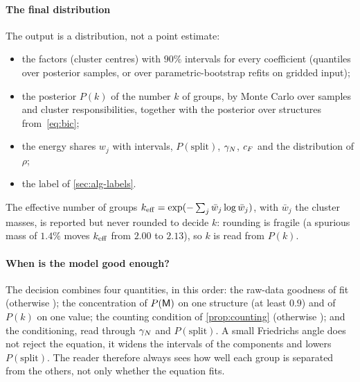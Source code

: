 \paragraph{The final distribution}
The output is a distribution, not a point estimate:
\begin{itemize}
  \item the factors (cluster centres) with $90\%$ intervals for every coefficient (quantiles over posterior samples, or over
  parametric-bootstrap refits on gridded input);
  \item the posterior $P(k)$ of the number $k$ of groups, by Monte Carlo over samples and cluster
  responsibilities, together with the posterior over structures from~\eqref{eq:bic};
  \item the energy shares $w_j$ with intervals, $P(\text{split})$, $\gamma_{N}$, $c_{F}$ and the distribution of $\rho$;
  \item the label of \cref{sec:alg-labels}.
\end{itemize}
The effective number of groups $k_{\mathrm{eff}}=\exp(-\sum_j\bar w_j\log\bar w_j)$, with $\bar w_j$ the cluster masses, is reported
but never rounded to decide $k$: rounding is fragile (a spurious mass of $1.4\%$ moves $k_{\mathrm{eff}}$ from $2.00$ to
$2.13$), so $k$ is read from $P(k)$.

\paragraph{When is the model good enough?}
The decision combines four quantities, in this order: the raw-data goodness of fit (otherwise \MIS); the
concentration of $P(\mathsf{M})$ on one structure (at least $0.9$) and of $P(k)$ on one value; the counting
condition of \cref{prop:counting} (otherwise \IDK); and the conditioning, read through $\gamma_{N}$ and
$P(\text{split})$. A small Friedrichs angle does not reject the equation, it widens the intervals of the
components and lowers $P(\text{split})$. The reader therefore always sees how well each group is
separated from the others, not only whether the equation fits.
